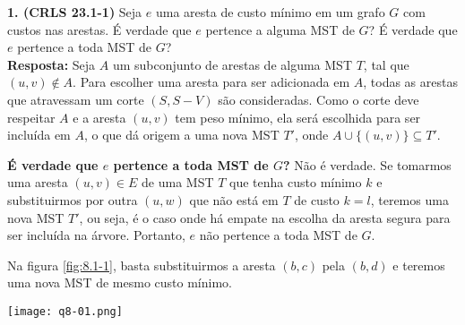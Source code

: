 
\noindent\textbf{1. (CRLS 23.1-1)} Seja $e$ uma aresta de custo mínimo em um grafo $G$ com custos nas arestas. É verdade que $e$ pertence a alguma MST de $G$? É verdade que $e$ pertence a toda MST de $G$?\\[6pt]
\textbf{Resposta:} Seja $A$ um subconjunto de arestas de alguma MST $T$, tal que $(u, v) \notin A$. Para escolher uma aresta para ser adicionada em $A$, todas as arestas que atravessam um corte $(S, S-V)$ são consideradas. Como o corte deve respeitar $A$ e a aresta $(u, v)$ tem peso mínimo, ela será escolhida para ser incluída em $A$, o que dá origem a uma nova MST $T'$, onde $A \cup \{(u, v)\} \subseteq T'$.

\textbf{É verdade que $e$ pertence a toda MST de $G$?}
Não é verdade. Se tomarmos uma aresta $(u, v) \in E$ de uma MST $T$ que tenha custo mínimo $k$ e substituirmos por outra $(u, w)$ que não está em $T$ de custo $k = l$, teremos uma nova MST $T'$, ou seja, é o caso onde há empate na escolha da aresta segura para ser incluída na árvore. Portanto, $e$ não pertence a toda MST de $G$.

Na figura \ref{fig:8.1-1}, basta substituirmos a aresta $(b, c)$ pela $(b, d)$ e teremos uma nova MST de mesmo custo mínimo.
\begin{center}
\texttt{[image: q8-01.png]}
\label{fig:8.1-1}
\end{center}